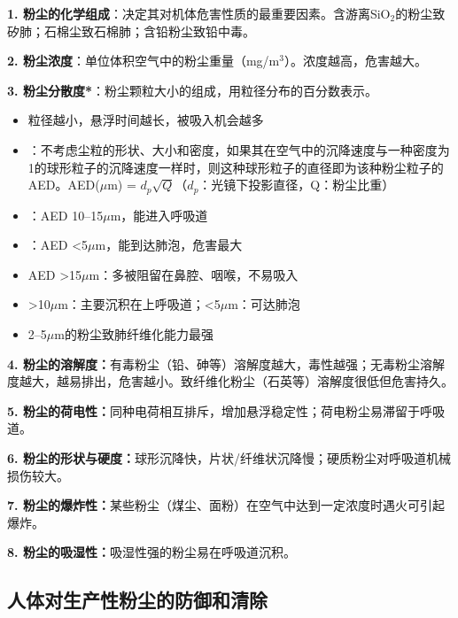 \begin{keybox}
\textbf{1. 粉尘的化学组成}：决定其对机体危害性质的最重要因素。含游离SiO$_2$的粉尘致矽肺；石棉尘致石棉肺；含铅粉尘致铅中毒。

\textbf{2. 粉尘浓度}：单位体积空气中的粉尘重量（mg/m$^3$）。浓度越高，危害越大。

\textbf{3. 粉尘分散度*}：粉尘颗粒大小的组成，用粒径分布的百分数表示。
\begin{itemize}[leftmargin=*]
    \item 粒径越小，悬浮时间越长，被吸入机会越多
    \item {}：不考虑尘粒的形状、大小和密度，如果其在空气中的沉降速度与一种密度为1的球形粒子的沉降速度一样时，则这种球形粒子的直径即为该种粉尘粒子的AED。AED($\mu$m) = $d_p\sqrt{Q}$（$d_p$：光镜下投影直径，Q：粉尘比重）
    \item {}：AED 10--15$\mu$m，能进入呼吸道
    \item {}：AED <5$\mu$m，能到达肺泡，危害最大
    \item AED >15$\mu$m：多被阻留在鼻腔、咽喉，不易吸入
    \item >10$\mu$m：主要沉积在上呼吸道；<5$\mu$m：可达肺泡
    \item 2--5$\mu$m的粉尘致肺纤维化能力最强
\end{itemize}

\textbf{4. 粉尘的溶解度：}有毒粉尘（铅、砷等）溶解度越大，毒性越强；无毒粉尘溶解度越大，越易排出，危害越小。致纤维化粉尘（石英等）溶解度很低但危害持久。

\textbf{5. 粉尘的荷电性：}同种电荷相互排斥，增加悬浮稳定性；荷电粉尘易滞留于呼吸道。

\textbf{6. 粉尘的形状与硬度：}球形沉降快，片状/纤维状沉降慢；硬质粉尘对呼吸道机械损伤较大。

\textbf{7. 粉尘的爆炸性：}某些粉尘（煤尘、面粉）在空气中达到一定浓度时遇火可引起爆炸。

\textbf{8. 粉尘的吸湿性：}吸湿性强的粉尘易在呼吸道沉积。
\end{keybox}

\subsection{人体对生产性粉尘的防御和清除}

